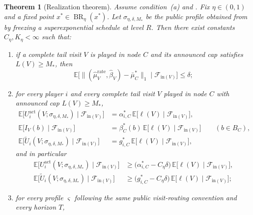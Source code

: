 \documentclass[12pt]{article}
\newtheorem{theorem}{Theorem}[section]
\theoremstyle{definition}
\newcommand{\E}{\mathbb{E}}
\newcommand{\1}{\mathbf{1}}
\newcommand{\cF}{\mathcal{F}}
\DeclareMathOperator{\BR}{BR}
\begin{document}
\begin{theorem}[Realization theorem]
\label{thm:realization}
Assume condition~\textnormal{(a)} and . Fix
$\eta\in(0,1)$ and a fixed point $x^*\in\BR_\eta(x^*)$. Let
$\sigma_{\eta,\delta,M_*}$ be the public profile obtained from
 by freezing a superexponential schedule at level $R$.
Then there exist constants $C_\eta,K_\eta<\infty$ such that:
\begin{enumerate}[label=\textnormal{(Q\arabic*)},leftmargin=2.8em]
\item if a complete tail visit $V$ is played in node $C$ and its announced cap
satisfies $L(V)\ge M_*$, then
\begin{equation}
\label{eq:visit-occupation-realization}
\E\bigl[\|(\widehat\mu_V^{\mathrm{rate}},\widehat\beta_V)-\bar\mu_C^*\|_1
\mid \cF_{\mathrm{in}(V)}\bigr]
\le \delta;
\end{equation}
\item for every player $i$ and every complete tail visit $V$ played in node $C$
with announced cap $L(V)\ge M_*$,
\begin{align}
\label{eq:visit-actual-realization-exact}
\E\bigl[U_i^{\mathrm{act}}(V;\sigma_{\eta,\delta,M_*})\mid \cF_{\mathrm{in}(V)}\bigr]
&=
\alpha_{i,C}^*\,
\E\bigl[\ell(V)\mid \cF_{\mathrm{in}(V)}\bigr],
\\
\label{eq:visit-exit-realization}
\E\bigl[I_V(b)\mid \cF_{\mathrm{in}(V)}\bigr]
&=
\beta_C^*(b)\,
\E\bigl[\ell(V)\mid \cF_{\mathrm{in}(V)}\bigr]
\qquad (b\in B_C),
\\
\label{eq:visit-aux-realization-exact}
\E\bigl[\widetilde U_i(V;\sigma_{\eta,\delta,M_*})\mid \cF_{\mathrm{in}(V)}\bigr]
&=
g_{i,C}^*\,
\E\bigl[\ell(V)\mid \cF_{\mathrm{in}(V)}\bigr],
\end{align}
and in particular
\begin{align}
\label{eq:visit-actual-realization}
\E\bigl[U_i^{\mathrm{act}}(V;\sigma_{\eta,\delta,M_*})\mid \cF_{\mathrm{in}(V)}\bigr]
&\ge
\bigl(\alpha_{i,C}^*-C_\eta\delta\bigr)\,
\E\bigl[\ell(V)\mid \cF_{\mathrm{in}(V)}\bigr],
\\
\label{eq:visit-aux-realization}
\E\bigl[\widetilde U_i(V;\sigma_{\eta,\delta,M_*})\mid \cF_{\mathrm{in}(V)}\bigr]
&\ge
\bigl(g_{i,C}^*-C_\eta\delta\bigr)\,
\E\bigl[\ell(V)\mid \cF_{\mathrm{in}(V)}\bigr];
\end{align}
\item for every profile $\varsigma$ following the same public visit-routing
convention and every horizon $T$,
\begin{equation}

\end{equation}
\end{enumerate}
\end{theorem}
\end{document}
